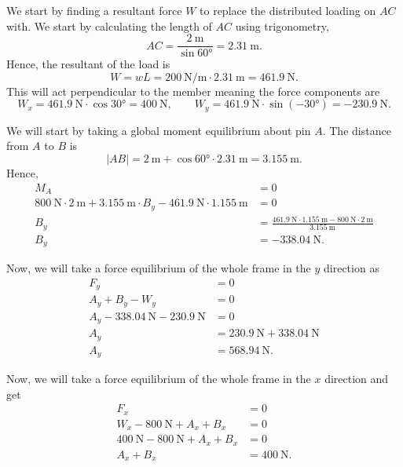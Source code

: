 \begin{derivation}
  We start by finding a resultant force $W$ to replace the distributed loading on $AC$ with.
  We start by calculating the length of $AC$ using trigonometry,
  \begin{equation*}
    AC = \frac{\qty{2}{\m}}{\sin \ang{60} } = \qty{2.31}{\m}
  .\end{equation*}
  Hence, the resultant of the load is
  \begin{equation*}
    W = wL = \qty{200}{\N\per\m} \cdot \qty{2.31}{\m}  = \qty{461,9}{\N}
  .\end{equation*}
  This will act perpendicular to the member meaning the force components are
  \begin{equation*}
    W_x = \qty{461.9}{\N} \cdot \cos \ang{30}  = \qty{400}{\N}, \qquad W_y = \qty{461.9}{\N} \cdot \sin (\ang{-30})  = -\qty{230.9}{\N}
  .\end{equation*}
  
  We will start by taking a global moment equilibrium about pin $A$.
  The distance from $A$ to $B$ is
  \begin{equation*}
    |AB| = \qty{2}{\m} + \cos \ang{60} \cdot \qty{2.31}{\m}  = \qty{3.155}{\meter}
  .\end{equation*}
  Hence,
  \begin{align*}
    M_{A} &= 0 \\
    \qty{800}{\N} \cdot \qty{2}{\m} + \qty{3.155}{\m} \cdot B_y - \qty{461.9}{\N} \cdot \qty{1.155}{\m}  &= 0 \\
    B_y &= \frac{\qty{461.9}{\N} \cdot \qty{1.155}{\m} - \qty{800}{\N} \cdot \qty{2}{\m} }{\qty{3.155}{\m} } \\
    B_y &= \qty{-338,04}{\N}
  .\end{align*}

  Now, we will take a force equilibrium of the whole frame in the $y$ direction as
  \begin{align*}
    F_y &= 0 \\
    A_y + B_y - W_y &= 0 \\
    A_y - \qty{338.04}{\N} - \qty{230.9}{\N} &= 0 \\
    A_y &= \qty{230.9}{\N} + \qty{338.04}{\N} \\
    A_y &= \qty{568,94}{\N}
  .\end{align*}
  
  Now, we will take a force equilibrium of the whole frame in the $x$ direction and get
  \begin{align*}
    F_x &= 0 \\
    W_x - \qty{800}{\N} + A_x + B_x &= 0 \\
    \qty{400}{\N} - \qty{800}{\N} + A_x + B_x &= 0 \\
    A_x + B_x &= \qty{400}{\N}
  .\end{align*}


\end{derivation}
